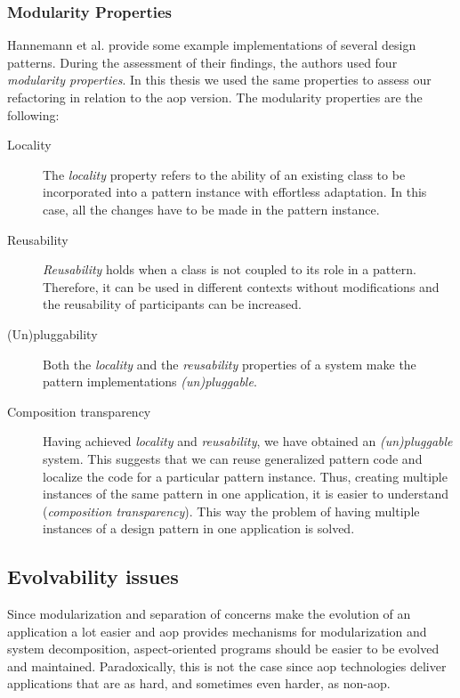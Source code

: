 \subsubsection{Modularity Properties}\label{BG Modularity Properties}
Hannemann et al. \cite{hannemann2002design} provide some example implementations of several design patterns.
During the assessment of their findings, the authors used four \textit{modularity properties}.
In this thesis we used the same properties to assess our refactoring in relation to the \ac{aop} version.
The modularity properties are the following:

\begin{description}
	\item [Locality]
	The \textit{locality} property refers to the ability of an existing class to be incorporated into a pattern instance with effortless adaptation. 
	In this case, all the changes have to be made in the pattern instance.

	\item [Reusability]
	\textit{Reusability} holds when a class is not coupled to its role in a pattern.
	Therefore, it can be used in different contexts without modifications and the reusability of participants can be increased.

	\item [(Un)pluggability]
	Both the \textit{locality} and the \textit{reusability} properties of a system make the pattern implementations \textit{(un)pluggable}.

	\item [Composition transparency]
	Having achieved \textit{locality} and \textit{reusability}, we have obtained an \textit{(un)pluggable} system.
	This suggests that we can reuse generalized pattern code and localize the code for a particular pattern instance.
	Thus, creating multiple instances of the same pattern in one application, it is easier to understand (\textit{composition transparency}).
	This way the problem of having multiple instances of a design pattern in one application is solved.
\end{description}

\subsection{Evolvability issues}\label{Aspect Oriented Programming Evolvability}
Since modularization and separation of concerns make the evolution of an application a lot easier and \ac{aop} provides mechanisms for modularization and system decomposition, aspect-oriented programs should be easier to be evolved and maintained.
Paradoxically, this is not the case since \ac{aop} technologies deliver applications that are as hard, and sometimes even harder, as non-\ac{aop}.

